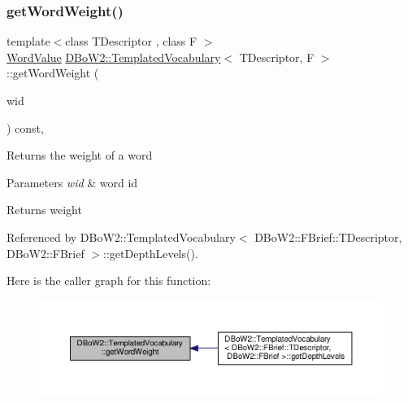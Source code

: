 \subsubsection{\texorpdfstring{get\+Word\+Weight()}{getWordWeight()}}
{\footnotesize\ttfamily template$<$class T\+Descriptor , class F $>$ \\
\hyperlink{namespaceDBoW2_a55fcd7333e591a38e96b91f41bc182f6}{Word\+Value} \hyperlink{classDBoW2_1_1TemplatedVocabulary}{D\+Bo\+W2\+::\+Templated\+Vocabulary}$<$ T\+Descriptor, F $>$\+::get\+Word\+Weight (\begin{DoxyParamCaption}\item[{\hyperlink{namespaceDBoW2_ab1a0d3283b2d4690a383372ed20bfeb5}{Word\+Id}}]{wid }\end{DoxyParamCaption}) const\hspace{0.3cm}{\ttfamily [inline]}, {\ttfamily [virtual]}}

Returns the weight of a word 
\begin{DoxyParams}{Parameters}
{\em wid} & word id \\
\hline
\end{DoxyParams}
\begin{DoxyReturn}{Returns}
weight 
\end{DoxyReturn}


Referenced by D\+Bo\+W2\+::\+Templated\+Vocabulary$<$ D\+Bo\+W2\+::\+F\+Brief\+::\+T\+Descriptor, D\+Bo\+W2\+::\+F\+Brief $>$\+::get\+Depth\+Levels().

Here is the caller graph for this function\+:\nopagebreak
\begin{figure}[H]
\begin{center}
\leavevmode
\includegraphics[width=350pt]{classDBoW2_1_1TemplatedVocabulary_ace5645b42739bea1e3da05c6cff60bad_icgraph}
\end{center}
\end{figure}
\mbox{\label{classDBoW2_1_1TemplatedVocabulary_abcbbda75df001522490774746bdb570c}} 

